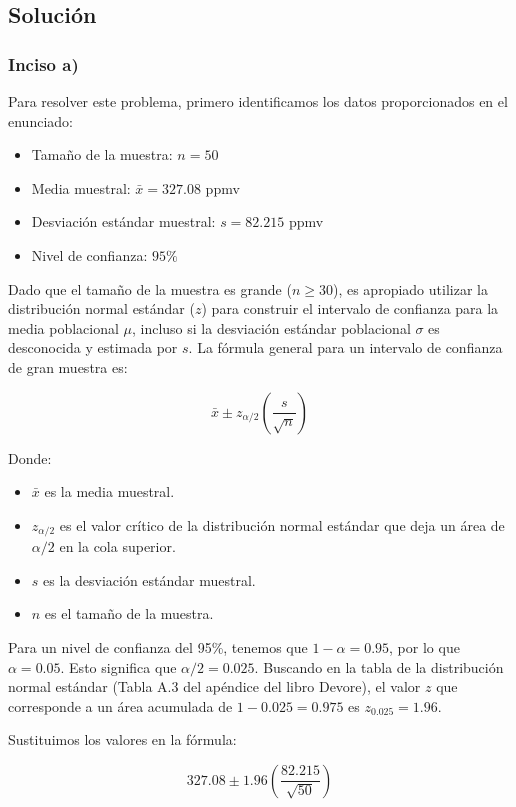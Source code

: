 \documentclass[12pt]{article}
\begin{document}
\subsection{Solución}

\subsubsection{Inciso a)}
Para resolver este problema, primero identificamos los datos proporcionados en el enunciado:
\begin{itemize}
    \item Tamaño de la muestra: $n = 50$
    \item Media muestral: $\bar{x} = 327.08$ ppmv
    \item Desviación estándar muestral: $s = 82.215$ ppmv
    \item Nivel de confianza: $95\%$
\end{itemize}

Dado que el tamaño de la muestra es grande ($n \geq 30$), es apropiado utilizar la distribución normal estándar ($z$) para construir el intervalo de confianza para la media poblacional $\mu$, incluso si la desviación estándar poblacional $\sigma$ es desconocida y estimada por $s$. La fórmula general para un intervalo de confianza de gran muestra es:

$$ \bar{x} \pm z_{\alpha/2} \left( \frac{s}{\sqrt{n}} \right) $$

Donde:
\begin{itemize}
    \item $\bar{x}$ es la media muestral.
    \item $z_{\alpha/2}$ es el valor crítico de la distribución normal estándar que deja un área de $\alpha/2$ en la cola superior.
    \item $s$ es la desviación estándar muestral.
    \item $n$ es el tamaño de la muestra.
\end{itemize}

Para un nivel de confianza del 95\%, tenemos que $1 - \alpha = 0.95$, por lo que $\alpha = 0.05$. Esto significa que $\alpha/2 = 0.025$. Buscando en la tabla de la distribución normal estándar (Tabla A.3 del apéndice del libro Devore), el valor $z$ que corresponde a un área acumulada de $1 - 0.025 = 0.975$ es $z_{0.025} = 1.96$.

Sustituimos los valores en la fórmula:

$$ 327.08 \pm 1.96 \left( \frac{82.215}{\sqrt{50}} \right) $$
\end{document}
